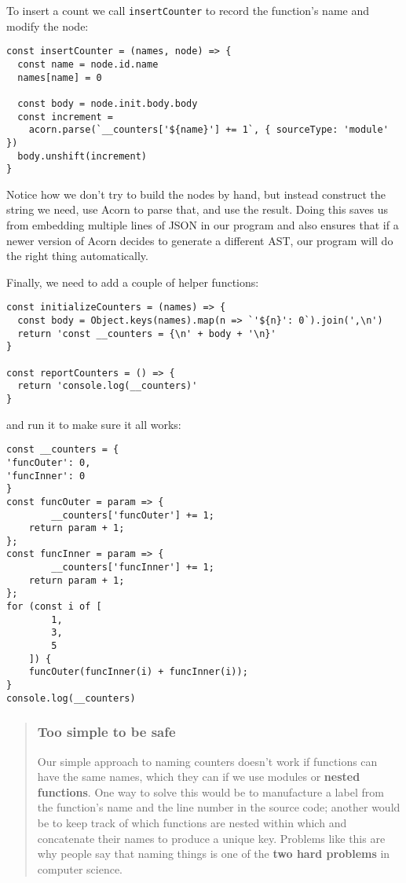 \documentclass[krantzl]{krantz}
\newcommand{\glossref}[1]{\textbf{#1}}
\newenvironment{callout}{\savenotes\begin{tBox}\begin{quotation}\toggletrue{inbox}\renewcommand{\thempfootnote}{\arabic{footnote}}}{\end{quotation}\vspace{\baselineskip}\end{tBox}\togglefalse{inbox}\spewnotes}
\begin{document}
To insert a count we call \texttt{insertCounter}
to record the function’s name and modify the node:


\begin{lstlisting}[frame=tblr]
const insertCounter = (names, node) => {
  const name = node.id.name
  names[name] = 0

  const body = node.init.body.body
  const increment =
    acorn.parse(`__counters['${name}'] += 1`, { sourceType: 'module' })
  body.unshift(increment)
}
\end{lstlisting}



\noindent Notice how we don’t try to build the nodes by hand,
but instead construct the string we need,
use Acorn to parse that,
and use the result.
Doing this saves us from embedding multiple lines of JSON in our program
and also ensures that if a newer version of Acorn decides to generate a different AST,
our program will do the right thing automatically.


Finally,
we need to add a couple of helper functions:


\begin{lstlisting}[frame=tblr]
const initializeCounters = (names) => {
  const body = Object.keys(names).map(n => `'${n}': 0`).join(',\n')
  return 'const __counters = {\n' + body + '\n}'
}

const reportCounters = () => {
  return 'console.log(__counters)'
}
\end{lstlisting}



\noindent and run it to make sure it all works:


\begin{lstlisting}[frame=tblr,backgroundcolor=\color{black!5}]
const __counters = {
'funcOuter': 0,
'funcInner': 0
}
const funcOuter = param => {
        __counters['funcOuter'] += 1;
    return param + 1;
};
const funcInner = param => {
        __counters['funcInner'] += 1;
    return param + 1;
};
for (const i of [
        1,
        3,
        5
    ]) {
    funcOuter(funcInner(i) + funcInner(i));
}
console.log(__counters)
\end{lstlisting}


\begin{callout}


\subsubsection*{Too simple to be safe}


Our simple approach to naming counters doesn’t work if functions can have the same names,
which they can if we use modules or \glossref{nested functions}.
One way to solve this would be to manufacture a label from the function’s name
and the line number in the source code;
another would be to keep track of which functions are nested within which
and concatenate their names to produce a unique key.
Problems like this are why people say that naming things
is one of the \glossref{two hard problems} in computer science.

\end{callout}
\end{document}
